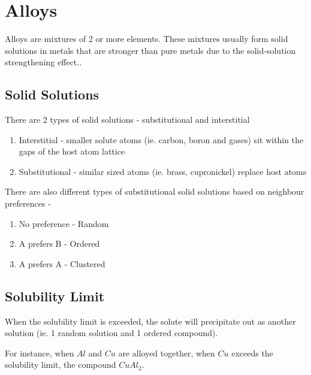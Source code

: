 \section{Alloys} %
\label{sec:alloys}

Alloys are mixtures of 2 or more elements. These mixtures usually form solid solutions in metals that are stronger than pure metals due to the solid-solution strengthening effect..

\subsection{Solid Solutions} %
\label{ssub:solid_solutions}


There are 2 types of solid solutions - substitutional and interstitial
\begin{enumerate}
  \item Interstitial - smaller solute atoms (ie. carbon, boron and gases) sit within the gaps of the host atom lattice
  \item Substitutional - similar sized atoms (ie. brass, cupronickel) replace host atoms
\end{enumerate}

There are also different types of substitutional solid solutions based on neighbour preferences -
\begin{enumerate}
  \item No preference - Random
  \item A prefers B - Ordered
  \item A prefers A - Clustered
\end{enumerate}

\subsection{Solubility Limit} %
\label{sub:solubility_limit}
 When the solubility limit is exceeded, the solute will precipitate out as another solution (ie. 1 random solution and 1 ordered compound).

For instance, when $Al$ and $Cu$ are alloyed together, when $Cu$ exceeds the solubility limit, the compound $CuAl_2$.



